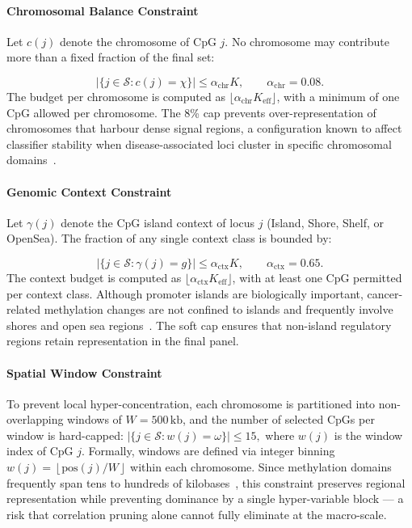 \paragraph{Chromosomal Balance Constraint}

Let $c(j)$ denote the chromosome of CpG $j$. No 
chromosome may contribute more than a fixed fraction of 
the final set:

\begin{equation}
|\{ j \in \mathcal{S} : c(j) = \chi \}|
\leq
\alpha_{\mathrm{chr}} K,
\qquad
\alpha_{\mathrm{chr}} = 0.08.
\label{eq:chr_constraint}
\end{equation}
The budget per chromosome is computed as 
$\lfloor \alpha_{\mathrm{chr}} K_{\mathrm{eff}} \rfloor$, 
with a minimum of one CpG allowed per chromosome.
The 8\% cap prevents over-representation of chromosomes 
that harbour dense signal regions, a configuration known 
to affect classifier stability when disease-associated loci 
cluster in specific chromosomal domains~\cite{Witten2010}.

\paragraph{Genomic Context Constraint}
Let $\gamma(j)$ denote the CpG island context of locus 
$j$ (Island, Shore, Shelf, or OpenSea). The fraction of 
any single context class is bounded by:

\begin{equation}
|\{ j \in \mathcal{S} : \gamma(j) = g \}|
\leq
\alpha_{\mathrm{ctx}} K,
\qquad
\alpha_{\mathrm{ctx}} = 0.65.
\label{eq:context_constraint}
\end{equation}
The context budget is computed as 
$\lfloor \alpha_{\mathrm{ctx}} K_{\mathrm{eff}} \rfloor$, 
with at least one CpG permitted per context class.
Although promoter islands are biologically important, 
cancer-related methylation changes are not confined to 
islands and frequently involve shores and open sea 
regions~\cite{Hansen2011, Fleischer2017}. The soft cap 
ensures that non-island regulatory regions retain 
representation in the final panel.

\paragraph{Spatial Window Constraint}

To prevent local hyper-concentration, each chromosome is 
partitioned into non-overlapping windows of 
$W = 500\,\mathrm{kb}$, and the number of selected CpGs 
per window is hard-capped:
$|\{ j \in \mathcal{S} : w(j) = \omega \}|
\leq 15,$
where $w(j)$ is the window index of CpG $j$. Formally, windows are defined via integer binning 
$w(j) = \left\lfloor \mathrm{pos}(j) / W \right\rfloor$ 
within each chromosome. Since 
methylation domains frequently span tens to hundreds of 
kilobases~\cite{Hansen2011}, this constraint preserves 
regional representation while preventing dominance by a 
single hyper-variable block — a risk that correlation 
pruning alone cannot fully eliminate at the macro-scale.

